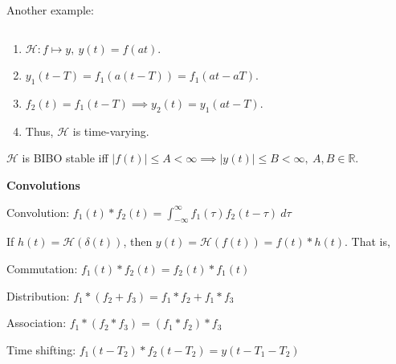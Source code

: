 \documentclass[twocolumn]{article}
\begin{document}
Another example:

\vspace{-.5em} $\quad$
\begin{minipage}{0.9\columnwidth}
    \begin{enumerate}
        \item $\mathcal H: f \mapsto y,\ y(t) = f(at)$.
        \item $y_1(t-T) = f_1(a(t-T)) = f_1(at - aT)$.
        \item $f_2(t) = f_1(t-T) \implies y_2(t) = y_1(at - T)$.
        \item Thus, $\mathcal{H}$ is time-varying.
    \end{enumerate}
\end{minipage}

$\mathcal{H}$ is BIBO stable iff $|f(t)| \leq A < \infty \implies |y(t)| \leq B < \infty,\ A, B \in \mathbb{R}$.

\vspace{-.5em}
\dotfill

\textbf{Convolutions}

Convolution: $f_1(t) * f_2(t) = \int_{-\infty}^\infty f_1(\tau) f_2(t-\tau)\ d\tau$

If $h(t) = \mathcal{H}(\delta(t))$, then $y(t) = \mathcal{H}(f(t)) = f(t) * h(t)$. That is,

\hfill
{}

Commutation: $f_1(t)*f_2(t) = f_2(t)*f_1(t)$

Distribution: $f_1*(f_2+f_3) = f_1*f_2 + f_1*f_3$

Association: $f_1*(f_2*f_3) = (f_1*f_2)*f_3$

Time shifting: $f_1(t-T_2)*f_2(t-T_2) = y(t-T_1-T_2)$
\end{document}
